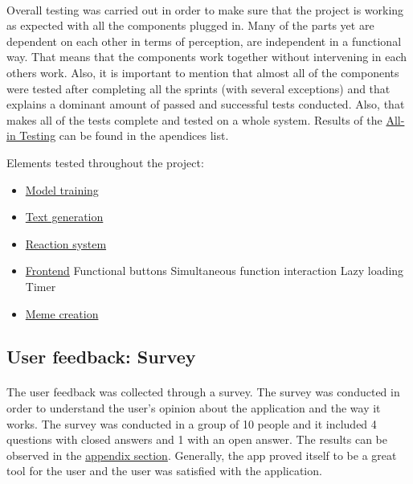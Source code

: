 \documentclass[12pt]{report}
\begin{document}
\paragraph{}
Overall testing was carried out in order to make sure that the project is working as expected with all the components plugged in.
Many of the parts yet are dependent on each other in terms of perception, are independent in a functional way. That means that 
the components work together without intervening in each others work. Also, it is important to mention that almost all of the components
were tested after completing all the sprints (with several exceptions) and that explains a dominant amount of passed and successful tests
conducted. Also, that makes all of the tests complete and tested on a whole system. Results of the \hyperref[appendix:all-in_testing]{All-in Testing}
can be found in the apendices list.

\clearpage

Elements tested throughout the project:
\begin{itemize}
  \item \hyperref[sec:model_testing]{Model training}
  \item \hyperref[appendix:model_testing]{Text generation}
  \item \hyperref[appendix:reaction_system_testing]{Reaction system}
  \item \hyperref[appendix:frontend_testing]{Frontend}
  \subitem Functional buttons
  \subitem Simultaneous function interaction
  \subitem Lazy loading
  \subitem Timer
  \item \hyperref[appendix:meme_creation_testing]{Meme creation}
\end{itemize}

\subsection*{User feedback: Survey}
\paragraph{}
The user feedback was collected through a survey. The survey was conducted in order to understand the user's opinion about the
application and the way it works. The survey was conducted in a group of 10 people and it included 4 questions with closed answers
and 1 with an open answer. The results can be observed in the \hyperref[appendix:survey_results]{appendix section}. Generally,
the app proved itself to be a great tool for the user and the user was satisfied with the application.
\end{document}

